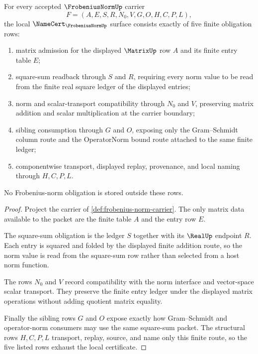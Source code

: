 \begin{theorem}
\label{thm:frobenius-norm-namecert-obligations}
For every accepted $\FrobeniusNormUp$ carrier
$$
F=(A,E,S,R,N_0,V,G,O,H,C,P,L),
$$
the local $\NameCert_{\FrobeniusNormUp}$ surface consists exactly of five finite obligation rows:
\begin{enumerate}
\item matrix admission for the displayed $\MatrixUp$ row $A$ and its finite entry table $E$;
\item square-sum readback through $S$ and $R$, requiring every norm value to be read from the finite real square ledger of the displayed entries;
\item norm and scalar-transport compatibility through $N_0$ and $V$, preserving matrix addition and scalar multiplication at the carrier boundary;
\item sibling consumption through $G$ and $O$, exposing only the Gram--Schmidt column route and the OperatorNorm bound route attached to the same finite ledger;
\item componentwise transport, displayed replay, provenance, and local naming through $H,C,P,L$.
\end{enumerate}
No Frobenius-norm obligation is stored outside these rows.
\end{theorem}
\begin{proof}
Project the carrier of \autoref{def:frobenius-norm-carrier}. The only matrix data available to the packet are the finite table $A$ and the entry row $E$.

The square-sum obligation is the ledger $S$ together with its $\RealUp$ endpoint $R$. Each entry is squared and folded by the displayed finite addition route, so the norm value is read from the square-sum row rather than selected from a host norm function.

The rows $N_0$ and $V$ record compatibility with the norm interface and vector-space scalar transport. They preserve the finite entry ledger under the displayed matrix operations without adding quotient matrix equality.

Finally the sibling rows $G$ and $O$ expose exactly how Gram--Schmidt and operator-norm consumers may use the same square-sum packet. The structural rows $H,C,P,L$ transport, replay, source, and name only this finite route, so the five listed rows exhaust the local certificate.
\end{proof}

